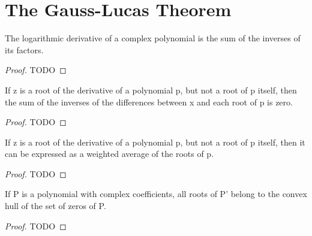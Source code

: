 %


\section{The Gauss-Lucas Theorem}

\begin{lemma}
  \label{lem:logDeriv_Polynomial}
  \leanok
  The logarithmic derivative of a complex polynomial
  is the sum of the inverses of its factors.
\end{lemma}
  
\begin{proof}
  TODO
\end{proof}

\begin{lemma}
  \label{lem:sum_inv_sub_roots_eq_zero}
  \leanok
  If z is a root of the derivative of a polynomial p, but not a root of p itself, then the sum of the inverses of the differences between x and each root of p is zero.
\end{lemma}
  
\begin{proof}
  TODO
\end{proof}

\begin{lemma}
  \label{lem:deriv_root_as_weighted_average_of_roots}
  \leanok
  If z is a root of the derivative of a polynomial p, but not a root of p itself,
  then it can be expressed as a weighted average of the roots of p.
\end{lemma}
  
\begin{proof}
  TODO
\end{proof}

\begin{theorem}
  \label{thm:gauss_lucas}
  \leanok
  If P is a polynomial with complex coefficients, all roots of P' belong to the convex hull of the set of zeros of P.
\end{theorem}
  
\begin{proof}
  TODO
\end{proof}

